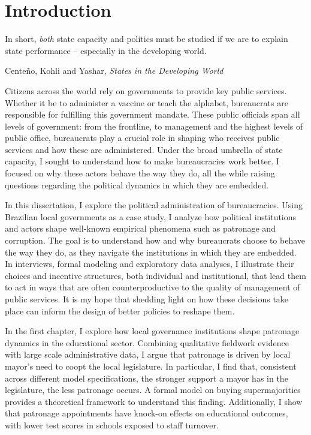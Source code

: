\section*{Introduction}

\epigraph{\singlespacing In short, \emph{both} state capacity and politics must be studied if we are to explain state performance -- especially in the developing world.}{\singlespacing Cente\~{n}o, Kohli and Yashar, \emph{States in the Developing World}}

\doublespacing

Citizens across the world rely on governments to provide key public services. Whether it be to administer a vaccine or teach the alphabet, bureaucrats are responsible for fulfilling this government mandate. These public officials span all levels of government: from the frontline, to management and the highest levels of public office, bureaucrats play a crucial role in shaping who receives public services and how these are administered. Under the broad umbrella of state capacity, I sought to understand how to make bureaucracies work better. I focused on why these actors behave the way they do, all the while raising questions regarding the political dynamics in which they are embedded.

In this dissertation, I explore the political administration of bureaucracies. Using Brazilian local governments as a case study, I analyze how political institutions and actors shape well-known empirical phenomena such as patronage and corruption. The goal is to understand how and why bureaucrats choose to behave the way they do, as they navigate the institutions in which they are embedded. In interviews, formal modeling and exploratory data analyses, I illustrate their choices and incentive structures, both individual and institutional, that lead them to act in ways that are often counterproductive to the quality of management of public services. It is my hope that shedding light on how these decisions take place can inform the design of better policies to reshape them.

In the first chapter, I explore how local governance institutions shape patronage dynamics in the educational sector. Combining qualitative fieldwork evidence with large scale administrative data, I argue that patronage is driven by local mayor's need to coopt the local legislature. In particular, I find that, consistent across different model specifications, the stronger support a mayor has in the legislature, the less patronage occurs. A formal model on buying supermajorities provides a theoretical framework to understand this finding. Additionally, I show that patronage appointments have knock-on effects on educational outcomes, with lower test scores in schools exposed to staff turnover.

